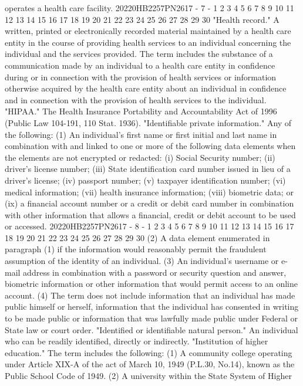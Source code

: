 operates a health care facility.
20220HB2257PN2617 - 7 -
1
2
3
4
5
6
7
8
9
10
11
12
13
14
15
16
17
18
19
20
21
22
23
24
25
26
27
28
29
30
"Health record." A written, printed or electronically
recorded material maintained by a health care entity in the
course of providing health services to an individual concerning
the individual and the services provided. The term includes the
substance of a communication made by an individual to a health
care entity in confidence during or in connection with the
provision of health services or information otherwise acquired
by the health care entity about an individual in confidence and
in connection with the provision of health services to the
individual.
"HIPAA." The Health Insurance Portability and Accountability
Act of 1996 (Public Law 104-191, 110 Stat. 1936).
"Identifiable private information." Any of the following:
(1) An individual's first name or first initial and last
name in combination with and linked to one or more of the
following data elements when the elements are not encrypted
or redacted:
(i) Social Security number;
(ii) driver's license number;
(iii) State identification card number issued in
lieu of a driver's license;
(iv) passport number;
(v) taxpayer identification number;
(vi) medical information;
(vii) health insurance information;
(viii) biometric data; or
(ix) a financial account number or a credit or debit
card number in combination with other information that
allows a financial, credit or debit account to be used or
accessed.
20220HB2257PN2617 - 8 -
1
2
3
4
5
6
7
8
9
10
11
12
13
14
15
16
17
18
19
20
21
22
23
24
25
26
27
28
29
30
(2) A data element enumerated in paragraph (1) if the
information would reasonably permit the fraudulent assumption
of the identity of an individual.
(3) An individual's username or e-mail address in
combination with a password or security question and answer,
biometric information or other information that would permit
access to an online account.
(4) The term does not include information that an
individual has made public himself or herself, information
that the individual has consented in writing to be made
public or information that was lawfully made public under
Federal or State law or court order.
"Identified or identifiable natural person." An individual
who can be readily identified, directly or indirectly.
"Institution of higher education." The term includes the
following:
(1) A community college operating under Article XIX-A of
the act of March 10, 1949 (P.L.30, No.14), known as the
Public School Code of 1949.
(2) A university within the State System of Higher
